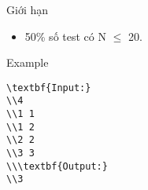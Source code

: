 Giới hạn
\begin{itemize}
	\item     50\% số test có N  $\le$  20.   
\end{itemize}
Example
\begin{verbatim}
\textbf{Input:}
\\4
\\1 1
\\1 2
\\2 2
\\3 3
\\\textbf{Output:}
\\3\end{verbatim}